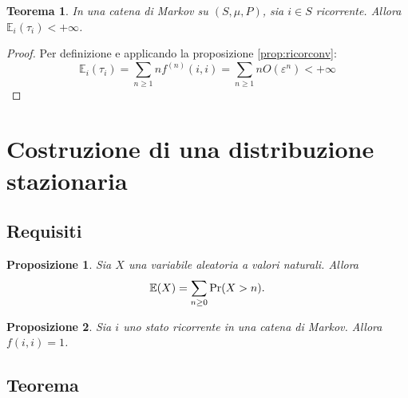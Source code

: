 \documentclass{article}
\theoremstyle{plain}
\newtheorem{thm}{Teorema}
\newtheorem{prop}{Proposizione}
\newcommand{\ev}{\mathbb E}
\newcommand{\ape}[1]{^{(#1)}}
\renewcommand{\epsilon}{\varepsilon}
\renewcommand{\Pr}{\mathrm{Pr}}
\begin{document}
\begin{thm}
	In una catena di Markov su $(S,\mu,P)$, sia $i\in S$ ricorrente. Allora $\ev_i(\tau_i)<+\infty$.
\end{thm}
\begin{proof}
	Per definizione e applicando la proposizione \ref{prop:ricorconv}:
	\begin{equation*}
		\ev_i(\tau_i) = \sum_{n\ge1} nf\ape{n}(i,i) = \sum_{n\ge1} nO(\epsilon^n) < +\infty
	\end{equation*}
\end{proof}




\section{Costruzione di una distribuzione stazionaria}


\subsection{Requisiti}
\begin{prop}\label{prop:evrandvar}
	Sia $X$ una variabile aleatoria a valori naturali. Allora
	\begin{equation*}
		\ev(X) = \sum_{n\ge0} \Pr(X>n) \text.
	\end{equation*}
\end{prop}

\begin{prop}\label{prop:ricorfii}
	Sia $i$ uno stato ricorrente in una catena di Markov. Allora $f(i,i)=1$.
\end{prop}


\subsection{Teorema}
\end{document}
